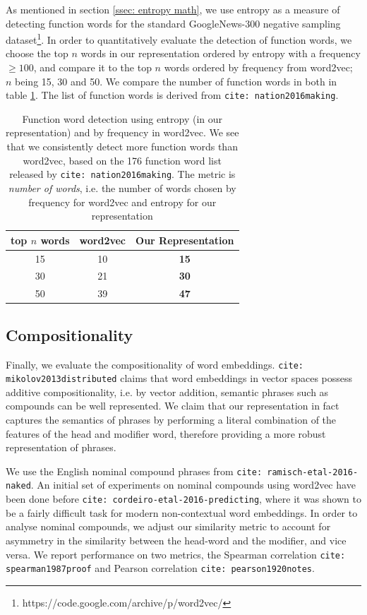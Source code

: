 \documentclass[11pt]{book}
\newcommand{\citep}[1]{\texttt{cite: #1}}
\newcommand{\citet}[1]{\texttt{cite: #1}}
\begin{document}
As mentioned in section \ref{ssec: entropy math}, we use entropy as a measure
of detecting function words for the standard GoogleNews-300 negative sampling
dataset\footnote{https://code.google.com/archive/p/word2vec/}. In order to
quantitatively evaluate the detection of function words, we choose the top $n$
words in our representation ordered by entropy with a frequency $\geq 100$, and
compare it to the top $n$ words ordered by frequency from word2vec; $n$ being
15, 30 and 50. We compare the number of function words in both in table
\ref{tab: function word eval}. The list of function words is derived from
\citet{nation2016making}.

\begin{table}[]
    \centering
    {\small
    \begin{tabular}{c|cc}
        top $n$ words & \bf word2vec & \bf Our Representation  \\ \hline
        15  & 10 & \bf 15 \\
        30  & 21 & \bf 30 \\
        50  & 39 & \bf 47  \\
    \end{tabular}
    }
    \caption{Function word detection using entropy (in our representation) and by frequency in word2vec. We see that we consistently detect more function words than word2vec, based on the 176 function word list released by \citet{nation2016making}. The metric is \emph{number of words}, i.e. the number of words chosen by frequency for word2vec and entropy for our representation}
    \label{tab: function word eval}
\end{table}

\subsection{Compositionality}
\label{ssec: entailment}

Finally, we evaluate the compositionality of word embeddings.
\citet{mikolov2013distributed} claims that word embeddings in vector spaces
possess additive compositionality, i.e. by vector addition, semantic phrases
such as compounds can be well represented. We claim that our representation in
fact captures the semantics of phrases by performing a literal combination of
the features of the head and modifier word, therefore providing a more robust
representation of phrases.

We use the English nominal compound phrases from
\citet{ramisch-etal-2016-naked}. An initial set of experiments on nominal
compounds using word2vec have been done before
\citep{cordeiro-etal-2016-predicting}, where it was shown to be a fairly
difficult task for modern non-contextual word embeddings. In order to analyse
nominal compounds, we adjust our similarity metric to account for asymmetry in
the similarity between the head-word and the modifier, and vice versa. We
report performance on two metrics, the Spearman correlation
\citep{spearman1987proof} and Pearson correlation \citep{pearson1920notes}. 
\end{document}
